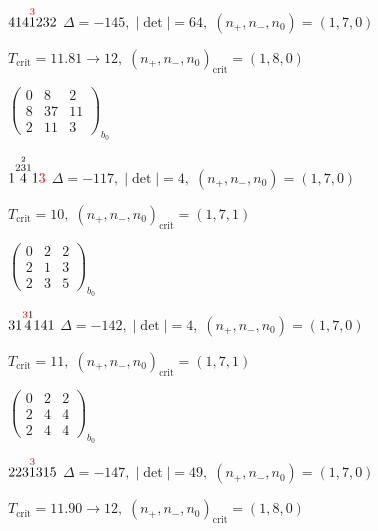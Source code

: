 \documentclass[10pt]{article}
\begin{document}
\smallskip

$414\overset{\textcolor{red}{3}}{1}232$ \quad $\Delta=-145,\; |\det|=64,\; (n_+,n_-,n_0)=(1,7,0)$

\hspace{1em}$T_{\text{crit}}=11.81 \to 12,\; (n_+,n_-,n_0)_{\text{crit}}=(1,8,0)$

\hspace{2em}$\left(\begin{smallmatrix}0 & 8 & 2 \\ 8 & 37 & 11 \\ 2 & 11 & 3\end{smallmatrix}\right)_{\!b_0}$

\smallskip

$1\overset{2\overset{2}{3}1}{4}1\textcolor{red}{3}$ \quad $\Delta=-117,\; |\det|=4,\; (n_+,n_-,n_0)=(1,7,0)$

\hspace{1em}$T_{\text{crit}}=10,\; (n_+,n_-,n_0)_{\text{crit}}=(1,7,1)$

\hspace{2em}$\left(\begin{smallmatrix}0 & 2 & 2 \\ 2 & 1 & 3 \\ 2 & 3 & 5\end{smallmatrix}\right)_{\!b_0}$

\smallskip

$31\overset{\textcolor{red}{3}1}{4}141$ \quad $\Delta=-142,\; |\det|=4,\; (n_+,n_-,n_0)=(1,7,0)$

\hspace{1em}$T_{\text{crit}}=11,\; (n_+,n_-,n_0)_{\text{crit}}=(1,7,1)$

\hspace{2em}$\left(\begin{smallmatrix}0 & 2 & 2 \\ 2 & 4 & 4 \\ 2 & 4 & 4\end{smallmatrix}\right)_{\!b_0}$

\smallskip

$223\overset{\textcolor{red}{3}}{1}315$ \quad $\Delta=-147,\; |\det|=49,\; (n_+,n_-,n_0)=(1,7,0)$

\hspace{1em}$T_{\text{crit}}=11.90 \to 12,\; (n_+,n_-,n_0)_{\text{crit}}=(1,8,0)$
\end{document}
